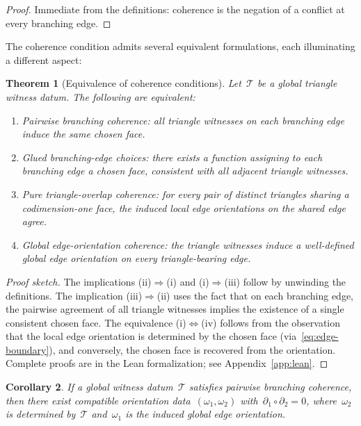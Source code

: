 \documentclass[11pt,a4paper]{article}
\theoremstyle{plain}
\newtheorem{theorem}{Theorem}[section]
\newtheorem{corollary}[theorem]{Corollary}
\theoremstyle{definition}
\theoremstyle{remark}
\newcommand{\cT}{\mathcal{T}}
\begin{document}
\begin{proof}
Immediate from the definitions: coherence is the negation of a conflict
at every branching edge.
\end{proof}

The coherence condition admits several equivalent formulations, each
illuminating a different aspect:

\begin{theorem}[Equivalence of coherence conditions]
\label{thm:equiv}
Let~$\cT$ be a global triangle witness datum. The following are equivalent:
\begin{enumerate}[label=\textup{(\roman*)},nosep]
  \item \emph{Pairwise branching coherence:}
        all triangle witnesses on each branching edge induce the same
        chosen face.
  \item \emph{Glued branching-edge choices:}
        there exists a function assigning to each branching edge a chosen
        face, consistent with all adjacent triangle witnesses.
  \item \emph{Pure triangle-overlap coherence:}
        for every pair of distinct triangles sharing a codimension-one face,
        the induced local edge orientations on the shared edge agree.
  \item \emph{Global edge-orientation coherence:}
        the triangle witnesses induce a well-defined global edge orientation
        on every triangle-bearing edge.
\end{enumerate}
\end{theorem}

\begin{proof}[Proof sketch]
The implications (ii)$\Rightarrow$(i) and (i)$\Rightarrow$(iii)
follow by unwinding the definitions.
The implication (iii)$\Rightarrow$(ii) uses the fact that on each
branching edge, the pairwise agreement of all triangle witnesses implies
the existence of a single consistent chosen face.
The equivalence (i)$\Leftrightarrow$(iv) follows from the observation
that the local edge orientation is determined by the chosen face
(via~\eqref{eq:edge-boundary}), and conversely, the chosen face is
recovered from the orientation. Complete proofs are in the Lean
formalization; see Appendix~\ref{app:lean}.
\end{proof}

\begin{corollary}
\label{cor:coherence-implies-compat}
If a global witness datum~$\cT$ satisfies pairwise branching coherence,
then there exist compatible orientation data~$(\omega_1, \omega_2)$
with~$\partial_1 \circ \partial_2 = 0$, where~$\omega_2$ is
determined by~$\cT$ and~$\omega_1$ is the induced global edge
orientation.
\end{corollary}
\end{document}
